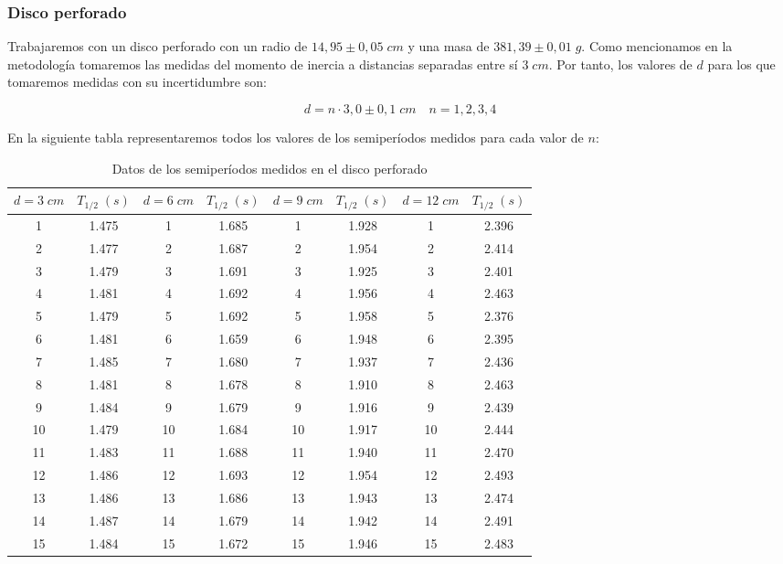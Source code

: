 \documentclass[a4paper,12pt,titlepage]{article}
\begin{document}
\subsubsection{Disco perforado}

Trabajaremos con un disco perforado con un radio de $14,95 \pm 0,05 \; cm$ y una masa de $381,39 \pm 0,01 \;g$. Como mencionamos en la metodología tomaremos las medidas del momento de inercia a distancias separadas entre sí $3\;cm$. Por tanto, los valores de $d$ para los que tomaremos medidas con su incertidumbre son:

\begin{equation}
    d = n\cdot 3,0 \pm 0,1 \; cm \quad n=1,2,3,4
\end{equation}

En la siguiente tabla representaremos todos los valores de los semiperíodos medidos para cada valor de $n$:

\begin{table}[h!]
    \centering
    \begin{tabular}{|c|c|c|c|c|c|c|c|}
    \hline
    $d=3\; cm$ &  $T_{1/2} \; (s)$ &  $d=6 \; cm$  & $T_{1/2} \; (s)$ & $d=9\;cm$   & $T_{1/2} \; (s)$ &  $d=12 \;cm$  & $T_{1/2} \; (s)$ \\ \hline
    1  & 1.475 & 1  & 1.685 & 1  & 1.928 & 1  & 2.396 \\ \hline
    2  & 1.477 & 2  & 1.687 & 2  & 1.954 & 2  & 2.414 \\ \hline
    3  & 1.479 & 3  & 1.691 & 3  & 1.925 & 3  & 2.401 \\ \hline
    4  & 1.481 & 4  & 1.692 & 4  & 1.956 & 4  & 2.463 \\ \hline
    5  & 1.479 & 5  & 1.692 & 5  & 1.958 & 5  & 2.376 \\ \hline
    6  & 1.481 & 6  & 1.659 & 6  & 1.948 & 6  & 2.395 \\ \hline
    7  & 1.485 & 7  & 1.680 & 7  & 1.937 & 7  & 2.436 \\ \hline
    8  & 1.481 & 8  & 1.678 & 8  & 1.910 & 8  & 2.463 \\ \hline
    9  & 1.484 & 9  & 1.679 & 9  & 1.916 & 9  & 2.439 \\ \hline
    10 & 1.479 & 10 & 1.684 & 10 & 1.917 & 10 & 2.444 \\ \hline
    11 & 1.483 & 11 & 1.688 & 11 & 1.940 & 11 & 2.470 \\ \hline
    12 & 1.486 & 12 & 1.693 & 12 & 1.954 & 12 & 2.493 \\ \hline
    13 & 1.486 & 13 & 1.686 & 13 & 1.943 & 13 & 2.474 \\ \hline
    14 & 1.487 & 14 & 1.679 & 14 & 1.942 & 14 & 2.491 \\ \hline
    15 & 1.484 & 15 & 1.672 & 15 & 1.946 & 15 & 2.483 \\ \hline
    \end{tabular}
    \caption{Datos de los semiperíodos medidos en el disco perforado}
    \label{Datos semiT steiner 1}
    \end{table}
\end{document}
